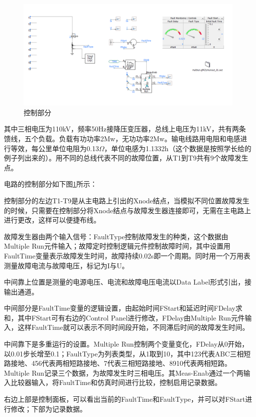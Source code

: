 \documentclass{article}
\begin{document}
{	\begin{figure}[htpb]
		\centering 
		\includegraphics[width=13cm]{figure/2.png}
		\caption{控制部分}
		\label{控制}
	\end{figure}	

	其中三相电压为110kV，频率50Hz接降压变压器，总线上电压为11kV，共有两条馈线，五个负载。负载有功功率2Mw，无功功率2Mw。输电线路用电阻和电感进行等效，每公里单位电阻为0.13$\Omega$，单位电感为1.1332h（这个数据是按照学长给的例子列出来的）。用不同的总线代表不同的故障位置，从T1到T9共有9个故障发生点。
	
	电路的控制部分如下图\ref{控制}所示：
	
	控制部分的左边T1-T9是从主电路上引出的Xnode结点，当模拟不同位置故障发生的时候，只需要在控制部分将Xnode结点与故障发生器连接即可，无需在主电路上进行更改，这样可以便捷布线。
	
	故障发生器由两个输入信号：FaultType控制故障发生的种类，这个数据由Multiple Run元件输入；故障定时控制逻辑元件控制故障时间，其中设置用FaultTime变量表示故障发生时间，故障持续0.02s即一个周期。同时用一个万用表测量故障电流与故障电压，标记为I与U。
	
	中间靠上位置是测量的电源电压、电流和故障电压电流以Data Label形式引出，接输出通道。
	
	中间部分是FaultTime变量的逻辑设置，由起始时间FStart和延迟时间FDelay求和，其中FStart可有右边的Control Panel进行修改，FDelay由Multiple Run元件输入，这样FaultTime就可以表示不同时间段开始，不同滞后时间的故障发生时间。
	
	中间靠下是多重运行的设置。Multiple Run控制两个变量变化，FDelay从0开始，以0.01步长增至0.1；FaultType为列表类型，从1取到10，其中123代表ABC三相短路接地、456代表两相短路接地、7代表三相短路接地、8910代表两相短路。Multiple Run记录三个数据，为故障发生时三相电压。其Meas-Enab通过一个两输入比较器输入，将FaultTime和仿真时间进行比较，控制启用记录数据。
	
	右边上部是控制面板，可以看出当前的FaultTime和FaultType，并可以对FStart进行修改；下部为记录数据。
	
}
\end{document}
